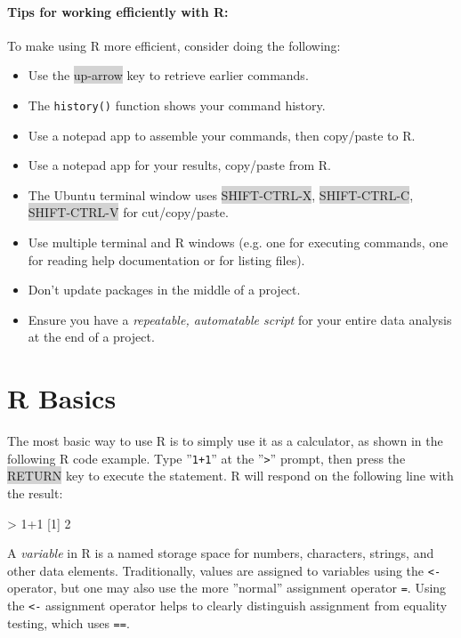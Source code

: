 \begin{tcolorbox}[colback=code]
\paragraph*{Tips for working efficiently with R:}

To make using R more efficient, consider doing the following:

\begin{itemize}
    \item Use the \colorbox{lightgray}{up-arrow} key to retrieve earlier commands.
    \item The \texttt{history()} function shows your command history.
    \item Use a notepad app to assemble your commands, then copy/paste to R.
    \item Use a notepad app for your results, copy/paste from R.
    \item The Ubuntu terminal window uses \colorbox{lightgray}{SHIFT-CTRL-X}, \colorbox{lightgray}{SHIFT-CTRL-C}, \colorbox{lightgray}{SHIFT-CTRL-V} for cut/copy/paste.
    \item Use multiple terminal and R windows (e.g. one for executing commands, one for reading help documentation or for listing files).
    \item Don't update packages in the middle of a project.
    \item Ensure you have a \emph{repeatable, automatable script} for your entire data analysis at the end of a project.
\end{itemize}

\end{tcolorbox}


\section{R Basics}

The most basic way to use R is to simply use it as a calculator, as shown in the following R code example. Type ''\texttt{1+1}'' at the ''\texttt{>}'' prompt, then press the \colorbox{lightgray}{RETURN} key to execute the statement. R will respond on the following line with the result:

\begin{samepage}
\begin{Rcode}
> 1+1
[1] 2
\end{Rcode}
\end{samepage}

A \emph{variable} in R is a named storage space for numbers, characters, strings, and other data elements. Traditionally, values are assigned to variables using the \texttt{<-} operator, but one may also use the more ''normal'' assignment operator \texttt{=}. Using the \texttt{<-} assignment operator helps to clearly distinguish assignment from equality testing, which uses \texttt{==}. 


